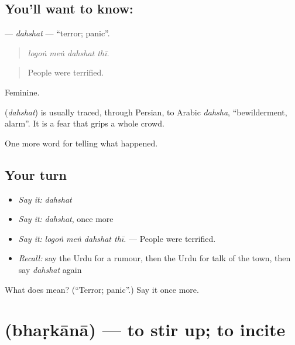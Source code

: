 \subsection*{You'll want to know: }
\textbf{} — \emph{dahshat} — \textquotedblleft{}terror; panic\textquotedblright{}.

\begin{quote}
   
\end{quote}

\begin{quote}
\emph{logoṅ meṅ dahshat thī.}
\end{quote}

\begin{quote}
People were terrified.
\end{quote}

Feminine.

\begin{cousinweb}
\textbf{} (\emph{dahshat}) is usually traced, through Persian, to Arabic \emph{dahsha}, \textquotedblleft{}bewilderment, alarm\textquotedblright{}. It is a fear that grips a whole crowd.
\end{cousinweb}

\begin{grammarlens}[title={What you've built}]
One more word for telling what happened.
\end{grammarlens}

\subsection*{Your turn}
\begin{itemize}
\raggedright
  \item \emph{Say it:} \emph{dahshat}
  \item \emph{Say it:} \emph{dahshat}, once more
  \item \emph{Say it:} \emph{logoṅ meṅ dahshat thī.} — People were terrified.
  \item \emph{Recall:} say the Urdu for a rumour, then the Urdu for talk of the town, then say \emph{dahshat} again
\end{itemize}

\begin{tcolorbox}[breakable,colback=teal!4,colframe=teal!35!black,title={Before you move on}]
What does  mean? (\textquotedblleft{}Terror; panic\textquotedblright{}.) Say it once more.
\end{tcolorbox}
\section[\texorpdfstring{\ur{بھڑکانا} (bhaṛkānā)}{بھڑکانا (bhaṛkānā)}]{ (bhaṛkānā) — to stir up; to incite}

